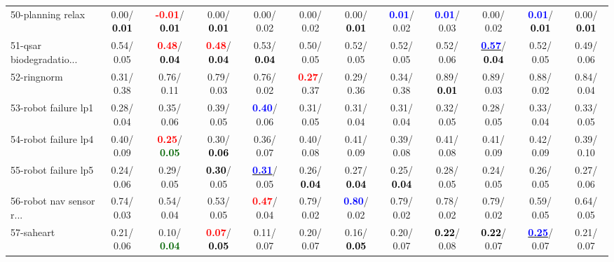 \begin{table}[h]
\begin{center}
{\begin{tabular}{lc|c|c|c|c|c|c|c|c|c|c}
50-planning relax &   0.00/\textcolor{black}{\textbf{  0.01}} & \textcolor{red}{\textbf{ -0.01}}/\textcolor{black}{\textbf{  0.01}} &   0.00/\textcolor{black}{\textbf{  0.01}} &   0.00/  0.02 &   0.00/  0.02 &   0.00/\textcolor{black}{\textbf{  0.01}} & \textcolor{blue}{\textbf{  0.01}}/  0.02 & \textcolor{blue}{\textbf{  0.01}}/  0.03 &   0.00/  0.02 & \textcolor{blue}{\textbf{  0.01}}/\textcolor{black}{\textbf{  0.01}} &   0.00/\textcolor{black}{\textbf{  0.01}} \\
51-qsar biodegradatio... &   0.54/  0.05 & \textcolor{red}{\textbf{  0.48}}/\textcolor{black}{\textbf{  0.04}} & \textcolor{red}{\textbf{  0.48}}/\textcolor{black}{\textbf{  0.04}} &   0.53/\textcolor{black}{\textbf{  0.04}} &   0.50/  0.05 &   0.52/  0.05 &   0.52/  0.05 &   0.52/  0.06 & \underline{\textcolor{blue}{\textbf{  0.57}}}/\textcolor{black}{\textbf{  0.04}} &   0.52/  0.05 &   0.49/  0.06 \\
52-ringnorm &   0.31/  0.38 &   0.76/  0.11 &   0.79/  0.03 &   0.76/  0.02 & \textcolor{red}{\textbf{  0.27}}/  0.37 &   0.29/  0.36 &   0.34/  0.38 &   0.89/\textcolor{black}{\textbf{  0.01}} &   0.89/  0.03 &   0.88/  0.02 &   0.84/  0.04 \\
53-robot failure lp1 &   0.28/  0.04 &   0.35/  0.06 &   0.39/  0.05 & \textcolor{blue}{\textbf{  0.40}}/  0.06 &   0.31/  0.05 &   0.31/  0.04 &   0.31/  0.04 &   0.32/  0.05 &   0.28/  0.05 &   0.33/  0.04 &   0.33/  0.05 \\ \hline
54-robot failure lp4 &   0.40/  0.09 & \textcolor{red}{\textbf{  0.25}}/\textcolor{darkgreen}{\textbf{  0.05}} &   0.30/\textcolor{black}{\textbf{  0.06}} &   0.36/  0.07 &   0.40/  0.08 &   0.41/  0.09 &   0.39/  0.08 &   0.41/  0.08 &   0.41/  0.09 &   0.42/  0.09 &   0.39/  0.10 \\
55-robot failure lp5 &   0.24/  0.06 &   0.29/  0.05 & \textcolor{black}{\textbf{  0.30}}/  0.05 & \underline{\textcolor{blue}{\textbf{  0.31}}}/  0.05 &   0.26/\textcolor{black}{\textbf{  0.04}} &   0.27/\textcolor{black}{\textbf{  0.04}} &   0.25/\textcolor{black}{\textbf{  0.04}} &   0.28/  0.05 &   0.24/  0.05 &   0.26/  0.05 &   0.27/  0.06 \\
56-robot nav sensor r... &   0.74/  0.03 &   0.54/  0.04 &   0.53/  0.05 & \textcolor{red}{\textbf{  0.47}}/  0.04 &   0.79/  0.02 & \textcolor{blue}{\textbf{  0.80}}/  0.02 &   0.79/  0.02 &   0.78/  0.02 &   0.79/  0.02 &   0.59/  0.05 &   0.64/  0.05 \\
57-saheart &   0.21/  0.06 &   0.10/\textcolor{darkgreen}{\textbf{  0.04}} & \textcolor{red}{\textbf{  0.07}}/\textcolor{black}{\textbf{  0.05}} &   0.11/  0.07 &   0.20/  0.07 &   0.16/\textcolor{black}{\textbf{  0.05}} &   0.20/  0.07 & \textcolor{black}{\textbf{  0.22}}/  0.08 & \textcolor{black}{\textbf{  0.22}}/  0.07 & \underline{\textcolor{blue}{\textbf{  0.25}}}/  0.07 &   0.21/  0.07 \\

\end{tabular}}
\end{center}
\end{table}
